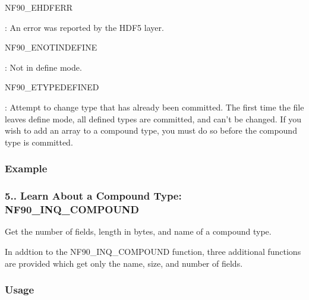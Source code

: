 {\ttfamily N\+F90\+\_\+\+E\+H\+D\+F\+E\+RR}

\+: An error was reported by the H\+D\+F5 layer.

{\ttfamily N\+F90\+\_\+\+E\+N\+O\+T\+I\+N\+D\+E\+F\+I\+NE}

\+: Not in define mode.

{\ttfamily N\+F90\+\_\+\+E\+T\+Y\+P\+E\+D\+E\+F\+I\+N\+ED}

\+: Attempt to change type that has already been committed. The first time the file leaves define mode, all defined types are committed, and can’t be changed. If you wish to add an array to a compound type, you must do so before the compound type is committed.

\subsubsection*{Example}\hypertarget{f90-user-defined-data-types_f90-learn-about-a-compound-type-nf90_inq_compound}{}\subsubsection{5.. Learn About a Compound Type\+: N\+F90\+\_\+\+I\+N\+Q\+\_\+\+C\+O\+M\+P\+O\+U\+ND}\label{f90-user-defined-data-types_f90-learn-about-a-compound-type-nf90_inq_compound}
Get the number of fields, length in bytes, and name of a compound type.

In addtion to the N\+F90\+\_\+\+I\+N\+Q\+\_\+\+C\+O\+M\+P\+O\+U\+ND function, three additional functions are provided which get only the name, size, and number of fields.

\subsubsection*{Usage}


